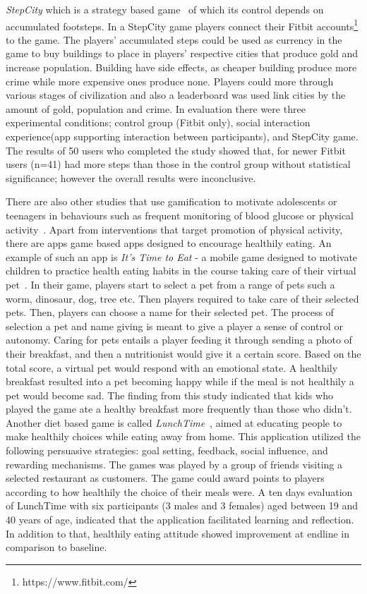 \emph{StepCity} which is a strategy based game~\citep{walsh2014stepcity} of which its control depends on accumulated footsteps. In a StepCity game players connect their Fitbit accounts\footnote{https://www.fitbit.com/} to the game. The players' accumulated steps could be used as currency in the game to buy buildings to place in players' respective cities that produce gold and increase population. Building have side effects, as cheaper building produce more crime while more expensive ones produce none. Players could more through various stages of civilization and also a leaderboard was used link cities by the amount of gold, population and crime. In evaluation there were three experimental conditions; control group (Fitbit only), social interaction experience(app supporting interaction between participants), and StepCity game. The results of 50 users who completed the study showed that, for newer Fitbit users (n=41) had more steps than those in the control group without statistical significance; however the overall results were inconclusive.  

There are also other studies that use gamification to motivate adolescents or teenagers in behaviours such as frequent monitoring of blood glucose or physical activity~\citep{arteaga2010:persuasive,cafazzo2012:bant}. Apart from interventions that target promotion of physical activity, there are apps game based apps designed to encourage healthily eating. An example of such an app is \emph{It's Time to Eat} - a mobile game designed to motivate children to practice health eating habits in the course taking care of their virtual pet~\citep{pollak2010s}. In their game, players start to select a pet from a range of pets such a worm, dinosaur, dog, tree etc. Then players required to take care of their selected pets. Then, players can choose a name for their selected pet. The process of selection a pet and name giving is meant to give a player a sense of control or autonomy. Caring for pets entails a player feeding it through sending a photo of their breakfast, and then a nutritionist would give it a certain score. Based on the total score, a virtual pet would respond with an emotional state. A healthily breakfast resulted into a pet becoming happy while if the meal is not healthily a pet would become sad. The finding from this study indicated that kids who played the game ate a healthy breakfast more frequently than those who didn't. Another diet based game is called \emph{LunchTime}~\citep{orji2013lunchtime}, aimed at educating people to make healthily choices while eating away from home. This application utilized the following persuasive strategies: goal setting, feedback, social influence, and rewarding mechanisms. The games was played by a group of friends visiting a selected restaurant as customers. The game could award points to players according to how healthily the choice of their meals were. A ten days evaluation  of LunchTime with six participants (3 males and 3 females) aged between 19 and 40 years of age, indicated that the application facilitated learning and reflection. In addition to that, healthily eating attitude showed improvement at endline in comparison to baseline. 

